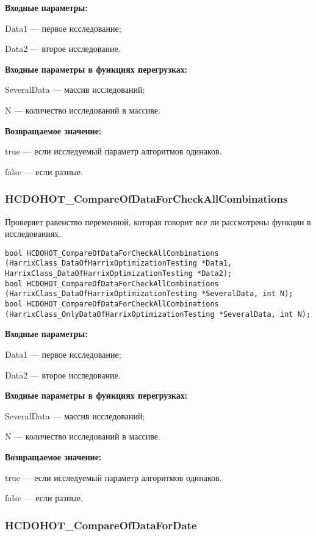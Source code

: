 \documentclass[a4paper,12pt]{article}
\begin{document}
\textbf{Входные параметры:}

Data1 --- первое исследование;

Data2 --- второе исследование.

\textbf{Входные параметры в функциях перегрузках:}

SeveralData --- массив исследований;

N --- количество исследований в массиве.

\textbf{Возвращаемое значение:}

true --- если исследуемый параметр алгоритмов одинаков.

false --- если разные.


\subsubsection{HCDOHOT\_CompareOfDataForCheckAllCombinations}\label{HCDOHOT_CompareOfDataForCheckAllCombinations}

Проверяет равенство переменной, которая говорит все ли рассмотрены функции в исследованиях.


\begin{lstlisting}[label=code_syntax_HCDOHOT_CompareOfDataForCheckAllCombinations,caption=Синтаксис]
bool HCDOHOT_CompareOfDataForCheckAllCombinations (HarrixClass_DataOfHarrixOptimizationTesting *Data1, HarrixClass_DataOfHarrixOptimizationTesting *Data2);
bool HCDOHOT_CompareOfDataForCheckAllCombinations (HarrixClass_DataOfHarrixOptimizationTesting *SeveralData, int N);
bool HCDOHOT_CompareOfDataForCheckAllCombinations (HarrixClass_OnlyDataOfHarrixOptimizationTesting *SeveralData, int N);
\end{lstlisting}

\textbf{Входные параметры:}

Data1 --- первое исследование;

Data2 --- второе исследование.

\textbf{Входные параметры в функциях перегрузках:}

SeveralData --- массив исследований;

N --- количество исследований в массиве.

\textbf{Возвращаемое значение:}

true --- если исследуемый параметр алгоритмов одинаков.

false --- если разные.


\subsubsection{HCDOHOT\_CompareOfDataForDate}\label{HCDOHOT_CompareOfDataForDate}
\end{document}
